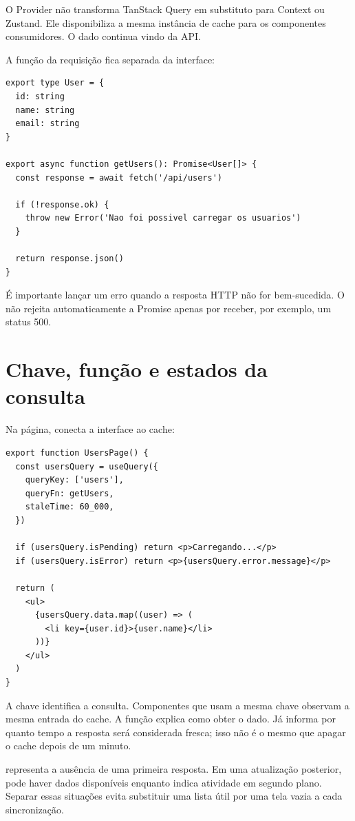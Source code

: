 O Provider não transforma TanStack Query em substituto para Context ou Zustand.
Ele disponibiliza a mesma instância de cache para os componentes consumidores.
O dado continua vindo da API.

A função da requisição fica separada da interface:

\begin{lstlisting}[caption={Função responsável por buscar usuários.}]
export type User = {
  id: string
  name: string
  email: string
}

export async function getUsers(): Promise<User[]> {
  const response = await fetch('/api/users')

  if (!response.ok) {
    throw new Error('Nao foi possivel carregar os usuarios')
  }

  return response.json()
}
\end{lstlisting}

É importante lançar um erro quando a resposta HTTP não for bem-sucedida. O
 não rejeita automaticamente a Promise apenas por receber, por
exemplo, um status 500.

\section{Chave, função e estados da consulta}

Na página,  conecta a interface ao cache:

\begin{lstlisting}[caption={Lista de usuários consumindo uma consulta.}]
export function UsersPage() {
  const usersQuery = useQuery({
    queryKey: ['users'],
    queryFn: getUsers,
    staleTime: 60_000,
  })

  if (usersQuery.isPending) return <p>Carregando...</p>
  if (usersQuery.isError) return <p>{usersQuery.error.message}</p>

  return (
    <ul>
      {usersQuery.data.map((user) => (
        <li key={user.id}>{user.name}</li>
      ))}
    </ul>
  )
}
\end{lstlisting}

A chave \codigo{['users']} identifica a consulta. Componentes que usam a mesma
chave observam a mesma entrada do cache. A função explica como obter o dado. Já
 informa por quanto tempo a resposta será considerada fresca;
isso não é o mesmo que apagar o cache depois de um minuto.

 representa a ausência de uma primeira resposta. Em uma
atualização posterior, pode haver dados disponíveis enquanto
 indica atividade em segundo plano. Separar essas situações
evita substituir uma lista útil por uma tela vazia a cada sincronização.

